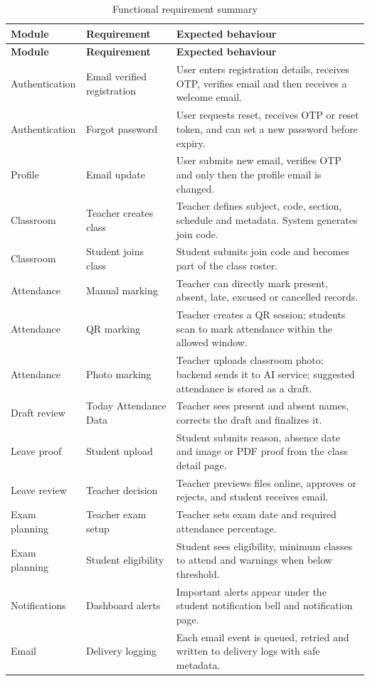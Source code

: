 \begin{longtable}{p{3.2cm} p{4.6cm} p{5.8cm}}
\caption{Functional requirement summary}
\label{tab:functional-reqs}\\
\toprule
\textbf{Module} & \textbf{Requirement} & \textbf{Expected behaviour}\\
\midrule
\endfirsthead
\toprule
\textbf{Module} & \textbf{Requirement} & \textbf{Expected behaviour}\\
\midrule
\endhead
Authentication & Email verified registration & User enters registration details, receives OTP, verifies email and then receives a welcome email.\\
Authentication & Forgot password & User requests reset, receives OTP or reset token, and can set a new password before expiry.\\
Profile & Email update & User submits new email, verifies OTP and only then the profile email is changed.\\
Classroom & Teacher creates class & Teacher defines subject, code, section, schedule and metadata. System generates join code.\\
Classroom & Student joins class & Student submits join code and becomes part of the class roster.\\
Attendance & Manual marking & Teacher can directly mark present, absent, late, excused or cancelled records.\\
Attendance & QR marking & Teacher creates a QR session; students scan to mark attendance within the allowed window.\\
Attendance & Photo marking & Teacher uploads classroom photo; backend sends it to AI service; suggested attendance is stored as a draft.\\
Draft review & Today Attendance Data & Teacher sees present and absent names, corrects the draft and finalizes it.\\
Leave proof & Student upload & Student submits reason, absence date and image or PDF proof from the class detail page.\\
Leave review & Teacher decision & Teacher previews files online, approves or rejects, and student receives email.\\
Exam planning & Teacher exam setup & Teacher sets exam date and required attendance percentage.\\
Exam planning & Student eligibility & Student sees eligibility, minimum classes to attend and warnings when below threshold.\\
Notifications & Dashboard alerts & Important alerts appear under the student notification bell and notification page.\\
Email & Delivery logging & Each email event is queued, retried and written to delivery logs with safe metadata.\\
\bottomrule
\end{longtable}

